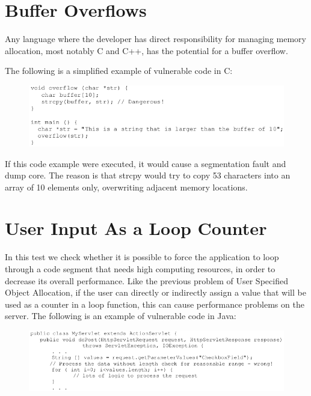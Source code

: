 	\section{Buffer Overflows}

		Any language where the developer has direct responsibility for managing memory allocation, 
		most notably C and C++, has the potential for a buffer overflow. 

		The following is a simplified example of vulnerable code in C:

		\begin{figure}[H]
			\includegraphics[width=\textwidth]{pics/buffer.png}
		\end{figure}

		If this code example were executed, it would cause a segmentation fault and dump core. 
		The reason is that strcpy would try to copy 53 characters into an array of 10 elements 
		only, overwriting adjacent memory locations. 

	\section{User Input As a Loop Counter}

		In this test we check whether it is possible to force the application to loop through a 
		code segment that needs high computing resources, in order to decrease its overall 
		performance. Like the previous problem of User Specified Object Allocation, if the user 
		can directly or indirectly assign a value that will be used as a counter in a loop function, 
		this can cause performance problems on the server. The following is an example of vulnerable 
		code in Java:
	
		\begin{figure}[H]
			\includegraphics[width=\textwidth]{pics/loop.png}
		\end{figure}

